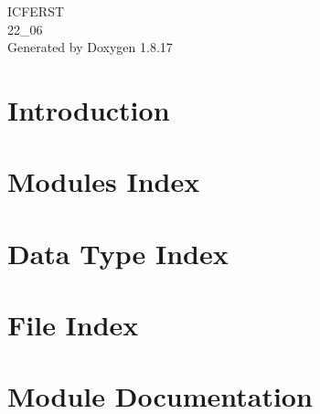 \let\mypdfximage\pdfximage\def\pdfximage{\immediate\mypdfximage}\documentclass[twoside]{book}
\newcommand{\+}{\discretionary{\mbox{\scriptsize$\hookleftarrow$}}{}{}}
\newcommand{\clearemptydoublepage}{%
  \newpage{\pagestyle{empty}\cleardoublepage}%
}
\begin{document}
\hypersetup{pageanchor=false,
             bookmarksnumbered=true,
             pdfencoding=unicode
            }
\begin{titlepage}
\vspace*{7cm}
\begin{center}%
{\Large I\+C\+F\+E\+R\+ST \\[1ex]\large 22\+\_\+06 }\\
\vspace*{1cm}
{\large Generated by Doxygen 1.8.17}\\
\end{center}
\end{titlepage}
\clearemptydoublepage
{}
\tableofcontents
\clearemptydoublepage
{}
\hypersetup{pageanchor=true}

\chapter{Introduction}
\label{index}\hypertarget{index}{}
\chapter{Modules Index}

\chapter{Data Type Index}

\chapter{File Index}

\chapter{Module Documentation}




























\end{document}
